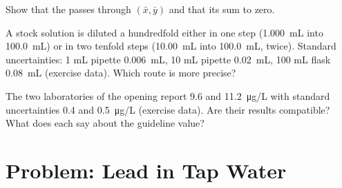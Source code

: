 \begin{exercise}[$\star\star\star$]\label{exo:b2:measurement-statistics:10}
Show that the  passes through $(\bar x, \bar y)$ and that its  sum to zero.
\end{exercise}

\begin{exercise}[$\star\star\star$]\label{exo:b2:measurement-statistics:11}
A stock solution is diluted a hundredfold either in one step (\qty{1.000}{mL} into \qty{100.0}{mL}) or
in two tenfold steps (\qty{10.00}{mL} into \qty{100.0}{mL}, twice). Standard uncertainties: 1 mL
pipette \qty{0.006}{mL}, 10 mL pipette \qty{0.02}{mL}, 100 mL flask \qty{0.08}{mL} (exercise data).
Which route is more precise?
\end{exercise}

\begin{exercise}[$\star\star\star$]\label{exo:b2:measurement-statistics:12}
The two laboratories of the opening report 9.6 and \qty{11.2}{\micro g/L} with standard uncertainties
0.4 and \qty{0.5}{\micro g/L} (exercise data). Are their results compatible? What does each say about the
guideline value?
\end{exercise}

\section{Problem: Lead in Tap Water}

